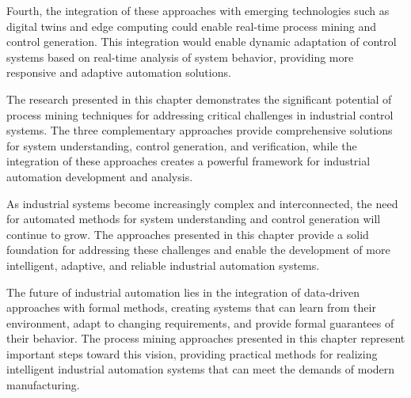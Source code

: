 Fourth, the integration of these approaches with emerging technologies such as digital twins and edge computing could enable real-time process mining and control generation. This integration would enable dynamic adaptation of control systems based on real-time analysis of system behavior, providing more responsive and adaptive automation solutions.

The research presented in this chapter demonstrates the significant potential of process mining techniques for addressing critical challenges in industrial control systems. The three complementary approaches provide comprehensive solutions for system understanding, control generation, and verification, while the integration of these approaches creates a powerful framework for industrial automation development and analysis.

As industrial systems become increasingly complex and interconnected, the need for automated methods for system understanding and control generation will continue to grow. The approaches presented in this chapter provide a solid foundation for addressing these challenges and enable the development of more intelligent, adaptive, and reliable industrial automation systems.

The future of industrial automation lies in the integration of data-driven approaches with formal methods, creating systems that can learn from their environment, adapt to changing requirements, and provide formal guarantees of their behavior. The process mining approaches presented in this chapter represent important steps toward this vision, providing practical methods for realizing intelligent industrial automation systems that can meet the demands of modern manufacturing.
